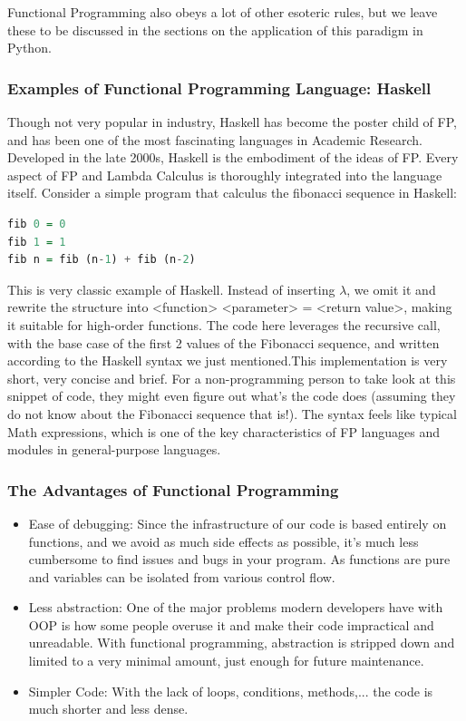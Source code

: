 \documentclass[twoside,final]{hcmut-report}
\begin{document}
\hspace*{1mm} Functional Programming also obeys a lot of other esoteric rules, but we leave these to be discussed in the sections on the application of this paradigm in Python. 

\subsubsection{Examples of Functional Programming Language: Haskell}

\hspace*{1mm} Though not very popular in industry, Haskell has become the poster child of FP, and has been one of the most fascinating languages in Academic Research. Developed in the late 2000s, Haskell is the embodiment of the ideas of FP. Every aspect of FP and Lambda Calculus is thoroughly integrated into the language itself. Consider a simple program that calculus the fibonacci sequence in Haskell: 

\begin{lstlisting}[language=Haskell, caption=Haskell Fibonacci]
fib 0 = 0
fib 1 = 1
fib n = fib (n-1) + fib (n-2)

\end{lstlisting}
\hspace*{1mm} This is very classic example of Haskell. Instead of inserting $\lambda$, we omit it and rewrite the structure into <function> <parameter> = <return value>, making it suitable for high-order functions. The code here leverages the recursive call, with the base case of the first 2 values of the Fibonacci sequence, and written according to the Haskell syntax we just mentioned.This implementation is very short, very concise and brief. For a non-programming person to take look at this snippet of code, they might even figure out what's the code does (assuming they do not know about the Fibonacci sequence that is!). The syntax feels like typical Math expressions, which is one of the key characteristics of FP languages and modules in general-purpose languages. 
\subsubsection{The Advantages of Functional Programming}
\begin{itemize}
\item Ease of debugging: Since the infrastructure of our code is based entirely on functions, and we avoid as much side effects as possible, it's much less cumbersome to find issues and bugs in your program. As functions are pure and variables can be isolated from various control flow.
\item Less abstraction: One of the major problems modern developers have with OOP is how some people overuse it and make their code impractical and unreadable. With functional programming, abstraction is stripped down and limited to a very minimal amount, just enough for future maintenance.
\item Simpler Code: With the lack of loops, conditions, methods,... the code is much shorter and less dense.
 

\end{itemize}
\end{document}
